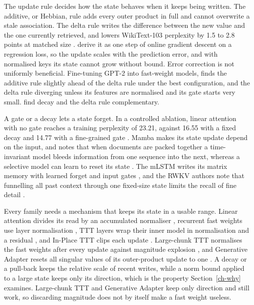 \documentclass[12pt,a4paper]{report}
\begin{document}
The update rule decides how the state behaves when it keeps being written. The additive, or Hebbian, rule adds every outer product in full and cannot overwrite a stale association. The delta rule writes the difference between the new value and the one currently retrieved, and lowers WikiText-103 perplexity by 1.5 to 2.8 points at matched size \citep{schlag2021linear}. \citet{yang2024deltanet} derive it as one step of online gradient descent on a regression loss, so the update scales with the prediction error, and with normalised keys its state cannot grow without bound. Error correction is not uniformly beneficial. Fine-tuning GPT-2 into fast-weight models, \citet{mao2022finetuning} finds the additive rule slightly ahead of the delta rule under the best configuration, and the delta rule diverging unless its features are normalised and its gate starts very small. \citet{yang2025gated} find decay and the delta rule complementary.

A gate or a decay lets a state forget. In a controlled ablation, linear attention with no gate reaches a training perplexity of 23.21, against 16.55 with a fixed decay and 14.77 with a fine-grained gate \citep{yang2024gla}. Mamba makes its state update depend on the input, and notes that when documents are packed together a time-invariant model bleeds information from one sequence into the next, whereas a selective model can learn to reset its state \citep{gu2024mamba}. The mLSTM writes its matrix memory with learned forget and input gates \citep{beck2024xlstm}, and the RWKV authors note that funnelling all past context through one fixed-size state limits the recall of fine detail \citep{peng2023rwkv}.

Every family needs a mechanism that keeps its state in a usable range. Linear attention divides its read by an accumulated normaliser \citep{katharopoulos2020transformers}, recurrent fast weights use layer normalisation \citep{ba2016using}, TTT layers wrap their inner model in normalisation and a residual \citep{sun2025learning}, and In-Place TTT clips each update \citep{feng2026inplace}. Large-chunk TTT normalises the fast weights after every update against magnitude explosion \citep{zhang2025test}, and Generative Adapter resets all singular values of its outer-product update to one \citep{chen2024generative}. A decay or a pull-back keeps the relative scale of recent writes, while a norm bound applied to a large state keeps only its direction, which is the property Section~\ref{ch-why} examines. Large-chunk TTT and Generative Adapter keep only direction and still work, so discarding magnitude does not by itself make a fast weight useless.
\end{document}
